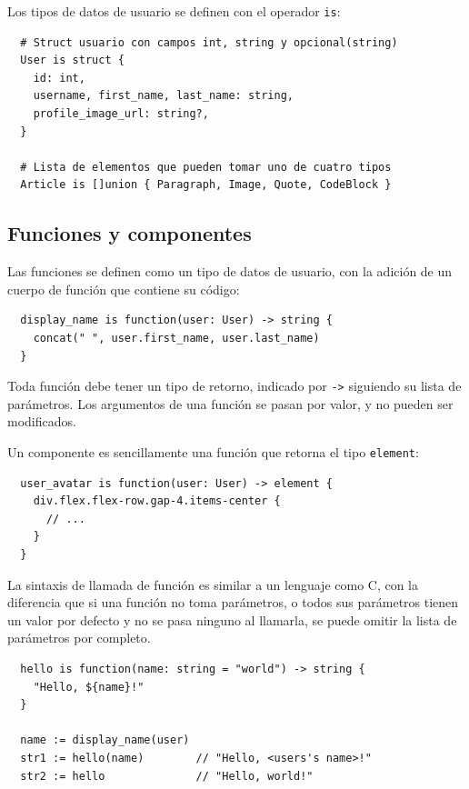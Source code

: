 Los tipos de datos de usuario se definen con el operador \texttt{is}:

\small
\begin{verbatim}
  # Struct usuario con campos int, string y opcional(string)
  User is struct {
    id: int,
    username, first_name, last_name: string,
    profile_image_url: string?,
  }

  # Lista de elementos que pueden tomar uno de cuatro tipos
  Article is []union { Paragraph, Image, Quote, CodeBlock }
\end{verbatim}
\normalsize

\subsection{Funciones y componentes}

Las funciones se definen como un tipo de datos de usuario, con la adición de un
cuerpo de función que contiene su código:

\small
\begin{verbatim}
  display_name is function(user: User) -> string {
    concat(" ", user.first_name, user.last_name)
  }
\end{verbatim}
\normalsize

Toda función debe tener un tipo de retorno, indicado por \texttt{->} siguiendo
su lista de parámetros. Los argumentos de una función se pasan por valor, y no
pueden ser modificados.

Un componente es sencillamente una función que retorna el tipo \texttt{element}:

\small
\begin{verbatim}
  user_avatar is function(user: User) -> element {
    div.flex.flex-row.gap-4.items-center {
      // ...
    }
  }
\end{verbatim}
\normalsize

La sintaxis de llamada de función es similar a un lenguaje como C, con la
diferencia que si una función no toma parámetros, o todos sus parámetros tienen
un valor por defecto y no se pasa ninguno al llamarla, se puede omitir la lista
de parámetros por completo.

\small
\begin{verbatim}
  hello is function(name: string = "world") -> string {
    "Hello, ${name}!"
  }

  name := display_name(user)
  str1 := hello(name)        // "Hello, <users's name>!"
  str2 := hello              // "Hello, world!"
\end{verbatim}
\normalsize

